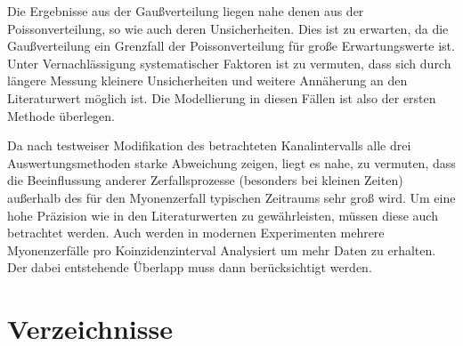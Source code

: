 \documentclass[slug=LM, room=Andreas-Schubert-Bau\,\ K\ 1A, supervisor=Anne-Sophie\ Berthold, coursedate=13.\ 12.\ 2019]{../../Lab_Report_LaTeX/lab_report}
\begin{document}
Die Ergebnisse aus der Gaußverteilung liegen nahe denen aus der
Poissonverteilung, so wie auch deren Unsicherheiten. Dies ist zu
erwarten, da die Gaußverteilung ein Grenzfall der Poissonverteilung
f\"ur gro\ss{}e Erwartungswerte ist. Unter Vernachl\"assigung
systematischer Faktoren ist zu vermuten, dass sich durch l\"angere
Messung kleinere Unsicherheiten und weitere Ann\"aherung an den
Literaturwert m\"oglich ist. Die Modellierung in diesen F\"allen ist
also der ersten Methode \"uberlegen.

Da nach testweiser Modifikation des betrachteten Kanalintervalls alle
drei Auswertungsmethoden starke Abweichung zeigen, liegt es nahe, zu
vermuten, dass die Beeinflussung anderer Zerfallsprozesse (besonders
bei kleinen Zeiten) außerhalb des f\"ur den Myonenzerfall typischen
Zeitraums sehr gro\ss{} wird. Um eine hohe Pr\"azision wie in den
Literaturwerten zu gew\"ahrleisten, m\"ussen diese auch betrachtet
werden. Auch werden in modernen Experimenten mehrere Myonenzerf\"alle
pro Koinzidenzinterval Analysiert um mehr Daten zu erhalten. Der dabei
entstehende \"Uberlapp muss dann ber\"ucksichtigt werden. \cite{fast}

\newpage
\section{Verzeichnisse}
\label{sec:literatur}

\listoffigures

\listoftables

\printbibliography
\end{document}
